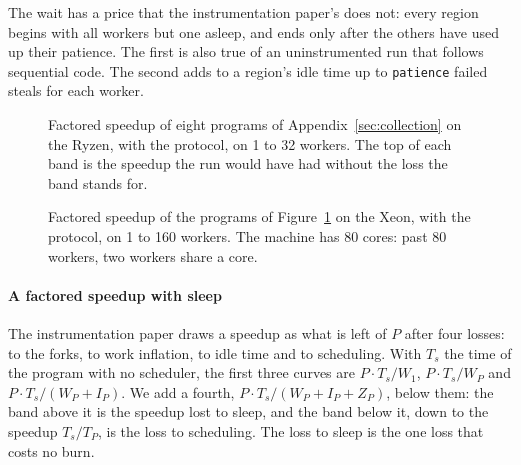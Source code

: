 \documentclass[sigplan,nonacm]{acmart}
\begin{document}
The wait has a price that the instrumentation paper's does not: every
region begins with all workers but one asleep, and ends only after the
others have used up their patience.
%
The first is also true of an uninstrumented run that follows
sequential code.
%
The second adds to a region's idle time up to \lstinline|patience|
failed steals for each worker.

\begin{figure}
\centering
{}\hfill
{}\hfill
{}\hfill
{}

\smallskip
{}\hfill
{}\hfill
{}\hfill
{}

\smallskip
\factoredlegend
\caption{Factored speedup of eight programs of Appendix~\ref{sec:collection}
  on the Ryzen, with the protocol, on 1 to 32 workers.
  The top of each band is the speedup the run would have had without
  the loss the band stands for.}
\label{fig:factored}
\end{figure}

\begin{figure}
\centering
{}\hfill
{}\hfill
{}\hfill
{}

\smallskip
{}\hfill
{}\hfill
{}\hfill
{}

\smallskip
\factoredlegend
\caption{Factored speedup of the programs of Figure~\ref{fig:factored}
  on the Xeon, with the protocol, on 1 to 160 workers. The machine has
  80 cores: past 80 workers, two workers share a core.}
\label{fig:factoredx}
\end{figure}

\paragraph{A factored speedup with sleep}
%
The instrumentation paper draws a speedup as what is left of $P$ after
four losses: to the forks, to work inflation, to idle time and to
scheduling.
%
With $T_s$ the time of the program with no scheduler, the first three
curves are $P \cdot T_s / W_1$, $P \cdot T_s / W_P$ and
$P \cdot T_s / (W_P + I_P)$.
%
We add a fourth, $P \cdot T_s / (W_P + I_P + Z_P)$, below them: the
band above it is the speedup lost to sleep, and the band below it,
down to the speedup $T_s / T_P$, is the loss to scheduling.
%
The loss to sleep is the one loss that costs no burn.
\end{document}
